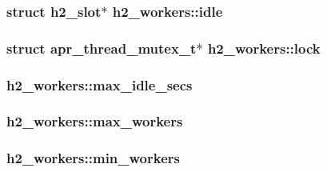\subsubsection[{\texorpdfstring{idle}{idle}}]{\setlength{\rightskip}{0pt plus 5cm}struct {\bf h2\+\_\+slot}$\ast$ h2\+\_\+workers\+::idle}\hypertarget{structh2__workers_a9d29faea794dfa06c29fa4d957412547}{}\label{structh2__workers_a9d29faea794dfa06c29fa4d957412547}
\subsubsection[{\texorpdfstring{lock}{lock}}]{\setlength{\rightskip}{0pt plus 5cm}struct {\bf apr\+\_\+thread\+\_\+mutex\+\_\+t}$\ast$ h2\+\_\+workers\+::lock}\hypertarget{structh2__workers_a7a483e64d1eb98bdac0f2e41d1ffeae9}{}\label{structh2__workers_a7a483e64d1eb98bdac0f2e41d1ffeae9}
\subsubsection[{\texorpdfstring{max\+\_\+idle\+\_\+secs}{max_idle_secs}}]{ h2\+\_\+workers\+::max\+\_\+idle\+\_\+secs}\hypertarget{structh2__workers_a124da2075be6c3670fc873ba12c2395a}{}\label{structh2__workers_a124da2075be6c3670fc873ba12c2395a}
\subsubsection[{\texorpdfstring{max\+\_\+workers}{max_workers}}]{ h2\+\_\+workers\+::max\+\_\+workers}\hypertarget{structh2__workers_aadaf15dfdd211a908c16876dbe624f83}{}\label{structh2__workers_aadaf15dfdd211a908c16876dbe624f83}
\subsubsection[{\texorpdfstring{min\+\_\+workers}{min_workers}}]{ h2\+\_\+workers\+::min\+\_\+workers}\hypertarget{structh2__workers_a2f9146472357988e152728e2f75aebdf}{}\label{structh2__workers_a2f9146472357988e152728e2f75aebdf}
